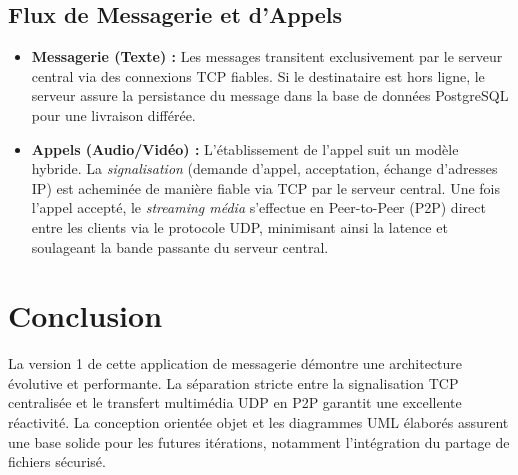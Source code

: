 \documentclass[12pt,a4paper]{article}
\begin{document}
\subsection{Flux de Messagerie et d'Appels}
\begin{itemize}
    \item \textbf{Messagerie (Texte) :} Les messages transitent exclusivement par le serveur central via des connexions TCP fiables. Si le destinataire est hors ligne, le serveur assure la persistance du message dans la base de données PostgreSQL pour une livraison différée.
    \item \textbf{Appels (Audio/Vidéo) :} L'établissement de l'appel suit un modèle hybride. La \textit{signalisation} (demande d'appel, acceptation, échange d'adresses IP) est acheminée de manière fiable via TCP par le serveur central. Une fois l'appel accepté, le \textit{streaming média} s'effectue en Peer-to-Peer (P2P) direct entre les clients via le protocole UDP, minimisant ainsi la latence et soulageant la bande passante du serveur central.
\end{itemize}

\section{Conclusion}
La version 1 de cette application de messagerie démontre une architecture évolutive et performante. La séparation stricte entre la signalisation TCP centralisée et le transfert multimédia UDP en P2P garantit une excellente réactivité. La conception orientée objet et les diagrammes UML élaborés assurent une base solide pour les futures itérations, notamment l'intégration du partage de fichiers sécurisé.
\end{document}
